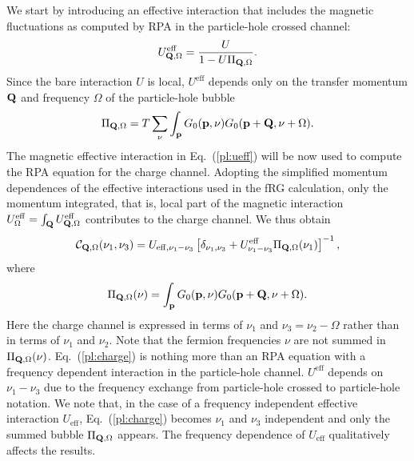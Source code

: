 We start by introducing an effective interaction that includes the magnetic fluctuations as computed by RPA \cite{Rohringer2012} in the particle-hole crossed channel:
\begin{equation}
 U^{\mathrm{eff}}_{\mathbf{Q},\Omega} = \frac{U}{1 - U \Pi_{\mathbf{Q},\Omega}}.
\label{pl:ueff}
\end{equation}
Since the bare interaction $U$ is local, $U^{\mathrm{eff}}$ depends only on the transfer momentum $\mathbf{Q}$ and frequency $\Omega$ of the particle-hole bubble
\begin{equation}
 \Pi_{\mathbf{Q},\Omega} =
 T \sum_{\nu} \int_{\mathbf{p}} G_0(\mathbf{p},\nu) G_0(\mathbf{p}+\mathbf{Q},\nu+\Omega).
\end{equation}
The magnetic effective interaction in Eq.~(\ref{pl:ueff}) will be now used to compute the RPA equation for the charge channel. Adopting the simplified momentum dependences of the effective interactions used in the fRG calculation, only the momentum integrated, that is, local part of the magnetic interaction
$U^{\mathrm{eff}}_{\Omega} = \int_{\mathbf{Q}} U^{\mathrm{eff}}_{\mathbf{Q},\Omega}$
contributes to the charge channel. We thus obtain
\begin{equation}
\mathcal{C}_{\mathbf{Q},\Omega} (\nu_1,\nu_3) = U_{\mathrm{eff},\nu_1-\nu_3} \left[ \delta_{\nu_1,\nu_3} + U^{\mathrm{eff}}_{\nu_1-\nu_3} \Pi_{\mathbf{Q},\Omega}(\nu_1) \right]^{-1} ,
\label{pl:charge}
\end{equation}
where
\begin{equation}
 \Pi_{\mathbf{Q},\Omega}(\nu) =
 \int_{\mathbf{p}} G_0(\mathbf{p},\nu) G_0(\mathbf{p}+\mathbf{Q},\nu+\Omega) .
\end{equation}
Here the charge channel is expressed in terms of $\nu_1$ and $\nu_3=\nu_2-\Omega$ rather than in terms of $\nu_1$ and $\nu_2$. Note that the fermion frequencies $\nu$ are not summed in $\Pi_{\mathbf{Q},\Omega}(\nu)$.
Eq.~(\ref{pl:charge}) is nothing more than an RPA equation with a frequency dependent interaction in the particle-hole channel.\cite{Rohringer2012} $U^{\mathrm{eff}}$ depends on $\nu_1-\nu_3$ due to the frequency exchange from particle-hole crossed to particle-hole notation.
We note that, in the case of a frequency independent effective interaction $U_{\mathrm{eff}}$, Eq.~(\ref{pl:charge}) becomes $\nu_1$ and $\nu_3$ independent 
and only the summed bubble $\Pi_{\mathbf{Q},\Omega}$ appears.
The frequency dependence of $U_{\mathrm{eff}}$ qualitatively affects the results. 

